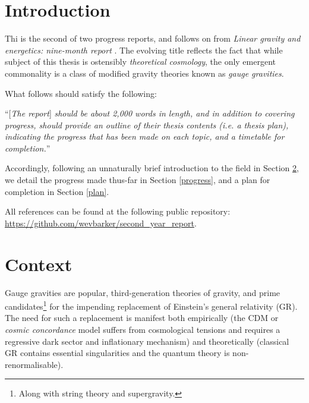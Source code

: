 \documentclass[twoside]{report}
\begin{document}



\begin{multicols}{2}
\section{Introduction}
Thi is the second of two progress reports, and follows on from \textit{Linear gravity and energetics: nine-month report} \cite{lg}. The evolving title reflects the fact that while subject of this thesis is ostensibly \textit{theoretical cosmology}, the only emergent commonality is a class of modified gravity theories known as \textit{gauge gravities}.

What follows should satisfy the following:

``[\textit{The report}] \textit{should be about 2,000 words in length, and in addition to covering progress, should provide an outline of their thesis contents (i.e. a thesis plan), indicating the progress that has been made on each topic, and a timetable for completion.}''

Accordingly, following an unnaturally brief introduction to the field in Section \ref{context}, we detail the progress made thus-far in Section \ref{progress}, and a plan for completion in Section \ref{plan}.

All references can be found at the following public repository: \url{https://github.com/wevbarker/second_year_report}.
\section{Context}\label{context}
Gauge gravities are popular, third-generation theories of gravity, and prime candidates\footnote{Along with string theory and supergravity.} for the impending replacement of Einstein's general relativity (GR). The need for such a replacement is manifest both empirically (the \textLambda CDM or \textit{cosmic concordance} model suffers from cosmological tensions and requires a regressive dark sector and inflationary mechanism) and theoretically (classical GR contains essential singularities and the quantum theory is non-renormalisable).


\end{multicols}
\end{document}

